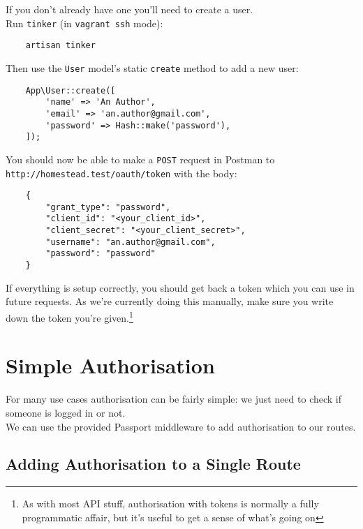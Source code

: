 If you don't already have one you'll need to create a user.
\\

Run \texttt{tinker} (in \texttt{vagrant ssh} mode):

\begin{verbatim}
    artisan tinker
\end{verbatim}

Then use the \texttt{User} model's static \texttt{create} method to add a new user:

\begin{verbatim}
    App\User::create([
        'name' => 'An Author',
        'email' => 'an.author@gmail.com',
        'password' => Hash::make('password'),
    ]);
\end{verbatim}

You should now be able to make a \texttt{POST} request in Postman to \\ \texttt{http://homestead.test/oauth/token} with the body:

\begin{verbatim}
    {
        "grant_type": "password",
        "client_id": "<your_client_id>",
        "client_secret": "<your_client_secret>",
        "username": "an.author@gmail.com",
        "password": "password"
    }
\end{verbatim}

If everything is setup correctly, you should get back a token which you can use in future requests. As we're currently doing this manually, make sure you write down the token you're given.\footnote{As with most API stuff, authorisation with tokens is normally a fully programmatic affair, but it's useful to get a sense of what's going on}


\pagebreak


\section{Simple Authorisation}

For many use cases authorisation can be fairly simple: we just need to check if someone is logged in or not.
\\

We can use the provided Passport middleware to add authorisation to our routes.


\subsection{Adding Authorisation to a Single Route}

